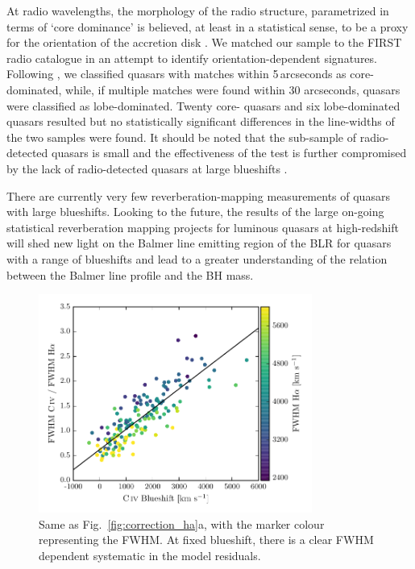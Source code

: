 At radio wavelengths, the morphology of the radio structure, parametrized in terms of `core dominance' is believed, at least in a statistical sense, to be a proxy for the orientation of the accretion disk \citep[e.g.][]{jackson91}.
We matched our sample to the FIRST radio catalogue \citep{white97} in an attempt to identify orientation-dependent signatures.  
Following \citet{shen11}, we classified quasars with matches within 5\,arcseconds as core-dominated, while, if multiple matches were found within 30 arcseconds, quasars were classified as lobe-dominated. 
Twenty core- quasars and six lobe-dominated quasars resulted but no statistically significant differences in the \ha line-widths of the two samples were found. 
It should be noted that the sub-sample of radio-detected quasars is small and the effectiveness of the test is further compromised by the lack of radio-detected quasars at large blueshifts \citep[see figure 14 of][for example]{richards11}.

There are currently very few reverberation-mapping measurements of quasars with large  blueshifts.
Looking to the future, the results of the large on-going statistical reverberation mapping projects \citep[e.g.][]{shen15,kingoz15} for luminous quasars at high-redshift will shed new light on the Balmer line emitting region of the BLR for quasars with a range of  blueshifts and lead to a greater understanding of the relation between the Balmer line profile and the BH mass. 

\begin{figure}
    \centering 
    \includegraphics[width=0.8\textwidth]{figures/chapter03/fwhm_correction_color.pdf}  
    \caption{Same as Fig.~\ref{fig:correction_ha}a, with the marker colour representing the \ha FWHM. At fixed  blueshift, there is a clear \ha FWHM dependent systematic in the model residuals.}   
    \label{fig:residuals_ha_fwhm}
\end{figure}

